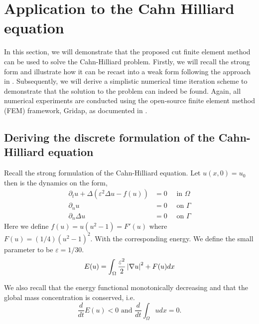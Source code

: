 
\newpage
\section{Application to the Cahn Hilliard equation }%

In this section, we will demonstrate that the proposed cut finite element method can be used to solve the Cahn-Hilliard problem. Firstly, we will recall the strong form and illustrate how it can be recast into a weak form following the approach in
\cite{feng2007fully}. Subsequently, we will derive a simplistic numerical time iteration scheme to demonstrate that the solution to the problem can indeed be found. Again, all numerical experiments are conducted using the open-source finite element method (FEM) framework, Gridap, as documented in \cite{verdugo22}.


\subsection{Deriving the discrete formulation of the Cahn-Hilliard equation}%
\label{sub:revisiting_the_strong_formulation}

 Recall the strong formulation of the Cahn-Hilliard equation.
Let $ u( x,0) =  u_{0}$ then is the dynamics on the form,
\begin{subequations}
\label{eq:strong_ch}
    \begin{align}
\partial _{t} u + \Delta  \left(  \varepsilon^2  \Delta u - f( u) \right)   &=0  \quad \text{ in } \Omega  \\
\partial _{n} u &= 0 \quad \text{ on } \Gamma  \\
\partial _{n}    \Delta u       &= 0 \quad \text{ on } \Gamma
    \end{align}
\end{subequations}
Here we define $f( u) = u( u^{2} -1)  = F' ( u)  $ where $F( u) = ( 1 / 4 ) ( u^2 -1 ) ^{2} $. With the corresponding energy. We define the small parameter to be $\varepsilon  = 1 / 30$.
\begin{equation}
    \label{eq:physical_prop}
E( u)  = \int_{\Omega }^{} \frac{\varepsilon^{2} }{2} \left\lvert  \nabla u  \right\rvert ^2 +  F( u) dx
\end{equation}

We also recall that the energy functional monotonically decreasing and that the global mass concentration is conserved, i.e.
\begin{equation}
\label{eq:mass_cons_energy_decrease2}
\frac{d}{dt} E( u)  <  0 \text{ and }\frac{d}{dt} \int_{\Omega }^{}  u dx = 0.
\end{equation}

